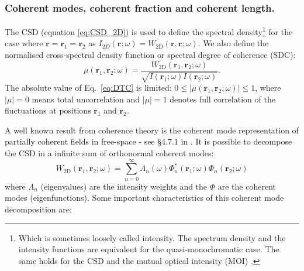 \documentclass{iucr}              %
\begin{document}
\subsubsection{Coherent modes, coherent fraction and coherent length.}

The CSD (equation \ref{eq:CSD_2D}) is used to define the spectral density\footnote{Which is sometimes loosely called intensity. The spectrum density and the intensity functions are equivalent for the quasi-monochromatic case. The same holds for the CSD and the mutual optical intensity (MOI) \cite{mandel_wolf}.} for the case where $\textbf{r}=\textbf{r}_1=\textbf{r}_2$ as $I_{2D}(\textbf{r};\omega)=W_\text{2D}(\textbf{r},\textbf{r};\omega)$. We also define the normalised cross-spectral density function or spectral degree of coherence (SDC):
\begin{equation}
\mu(\textbf{r}_1,\textbf{r}_2;\omega) = \frac{W_\text{2D}(\textbf{r}_1,\textbf{r}_2;\omega)}{\sqrt{I(\textbf{r}_1;\omega) I(\textbf{r}_2;\omega)}}.
\label{eq:DTC}
\end{equation}
The absolute value of Eq.~\ref{eq:DTC} is limited: $0\leq|\mu(\textbf{r}_1,\textbf{r}_2;\omega)|\leq 1$, where $|\mu|=0$ means total uncorrelation and $|\mu|=1$ denotes full correlation of the fluctuations at positions $\textbf{r}_1$ and $\textbf{r}_2$.

A well known result from coherence theory is the coherent mode representation of partially coherent fields in free-space - see §4.7.1 in \cite{mandel_wolf}. It is possible to decompose the CSD in a infinite sum of orthonormal coherent modes:
\begin{equation}\label{eq:W2DCMD}
W_\text{2D}(\textbf{r}_1,\textbf{r}_2;\omega) = \sum_{n=0}^{\infty} \Lambda_n(\omega) \Phi_{n}^*(\textbf{r}_1;\omega) \Phi_{n}(\textbf{r}_2;\omega)
\end{equation}
where $\Lambda_n$ (eigenvalues) are the intensity weights and the $\Phi$ are the coherent modes (eigenfunctions). 
Some important characteristics of this coherent mode decomposition are: 
\end{document}
